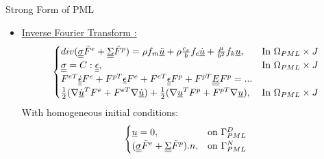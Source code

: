 \begin{frame}{Strong Form of PML}
\begin{itemize}
\item \underline{Inverse Fourier Transform :}
\begin{equation}
\begin{cases}
div(\underline{\underline{\sigma}}\tilde{F}^e + \underline{\underline{\Sigma}}\tilde{F}^p) = \rho f_m \underline{\ddot{u}} + \rho \frac{c_s}{b} f_c \underline{\dot{u}} + \frac{\mu}{b^2}f_k \underline{u}, & \text{In } \Omega_{PML} \times J\\
\underline{\underline{\sigma}} =  C : \underline{\underline{\epsilon}} , & \text{In } \Omega_{PML} \times J\\
F^{eT} \underline{\underline{\dot{\epsilon}}}F^e + F^{pT}\underline{\epsilon}F^e + F^{eT}\underline{\underline{\epsilon}}F^p + F^{pT} \underline{\underline{E}} F^p = ...\\
\frac{1}{2}(\nabla \underline{\dot{u}}^T F^e + F^{eT} \nabla \underline{\dot{u}})+\frac{1}{2}(\nabla \underline{u}^T F^p + F^{pT} \nabla \underline{u}), & \text{In } \Omega_{PML} \times J\\
\end{cases}
\end{equation}
With homogeneous initial conditions:
\begin{equation}
\begin{cases}
\underline{u}=0,& \text{on } \Gamma_{PML}^D\\
(\underline{\underline{\sigma}}\tilde{F}^e + \underline{\underline{\Sigma}}\tilde{F}^p).n , & \text{on } \Gamma_{PML}^N 
\end{cases}
\label{eq:main}
\end{equation}
\end{itemize}
\end{frame}

